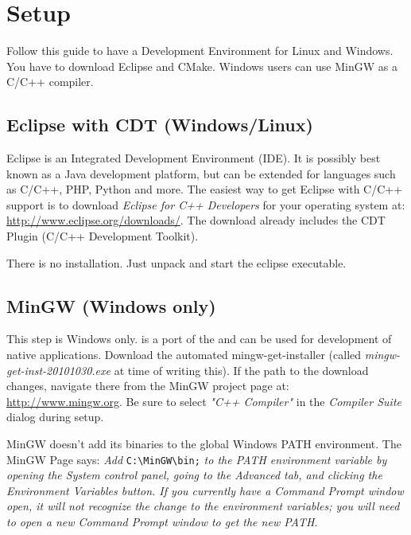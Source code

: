 \section{Setup}
Follow this guide to have a Development Environment for Linux and Windows. You have to download Eclipse and CMake. Windows users can use MinGW as a C/C++ compiler. 

\subsection{Eclipse with CDT (Windows/Linux)}
Eclipse is an Integrated Development Environment (IDE). It is possibly best known as a Java development platform, but can be extended for languages such as C/C++, PHP, Python and more. The easiest way to get Eclipse with C/C++ support is to download \textit{Eclipse for C++ Developers} for your operating system at: \url{http://www.eclipse.org/downloads/}. The download already includes the CDT Plugin (C/C++ Development Toolkit).

There is no installation. Just unpack and start the eclipse executable.

\subsection{MinGW (Windows only)}
This step is Windows only.  is a port of the  and can be used for development of native  applications. Download the automated mingw-get-installer  (called \textit{mingw-get-inst-20101030.exe} at time of writing this). If the path to the download changes, navigate there from the MinGW project page at: \url{http://www.mingw.org}. Be sure to select \textit{"C++ Compiler"} in the \textit{Compiler Suite} dialog during setup.

MinGW doesn't add its binaries to the global Windows PATH environment. The MinGW Page says: \textit{Add }\verb|C:\MinGW\bin;|\textit{ to the PATH environment variable by opening the System control panel, going to the Advanced tab, and clicking the Environment Variables button. If you currently have a Command Prompt window open, it will not recognize the change to the environment variables; you will need to open a new Command Prompt window to get the new PATH.}

